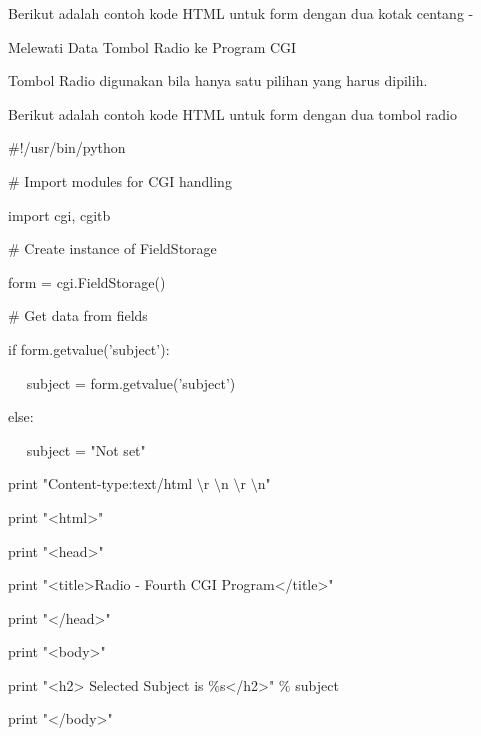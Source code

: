\begin{12pt}
\begin{12pt}
\begin{12pt}
\begin{12pt}
\begin{12pt}
\begin{12pt}
\begin{12pt}
\vspace{12pt}
\noindent 
Berikut adalah contoh kode HTML untuk form dengan dua kotak centang - \par
\vspace{12pt}
\noindent 
Melewati Data Tombol Radio ke Program CGI \par
\vspace{12pt}
\noindent 
Tombol Radio digunakan bila hanya satu pilihan yang harus dipilih. \par
\vspace{12pt}
\noindent 
Berikut adalah contoh kode HTML untuk form dengan dua tombol radio  \par
\vspace{12pt}
\vspace{12pt}
\noindent 
 $  \#  $!/usr/bin/python \par
\vspace{12pt}
\noindent 
 $  \#  $ Import modules for CGI handling  \par
\noindent 
import cgi, cgitb  \par
\vspace{12pt}
\noindent 
 $  \#  $ Create instance of FieldStorage  \par
\noindent 
form = cgi.FieldStorage()  \par
\vspace{12pt}
\noindent 
 $  \#  $ Get data from fields \par
\noindent 
if form.getvalue('subject'): \par
\noindent 
~~ subject = form.getvalue('subject') \par
\noindent 
else: \par
\noindent 
~~ subject = "Not set" \par
\vspace{12pt}
\noindent 
print "Content-type:text/html $  \setminus  $r $  \setminus  $n $  \setminus  $r $  \setminus  $n" \par
\noindent 
print "<html>" \par
\noindent 
print "<head>" \par
\noindent 
print "<title>Radio - Fourth CGI Program</title>" \par
\noindent 
print "</head>" \par
\noindent 
print "<body>" \par
\noindent 
print "<h2> Selected Subject is  $  \%  $s</h2>"  $  \%  $ subject \par
\noindent 
print "</body>" \par
\noindent 

\end{12pt}
\end{12pt}
\end{12pt}
\end{12pt}
\end{12pt}
\end{12pt}
\end{12pt}
